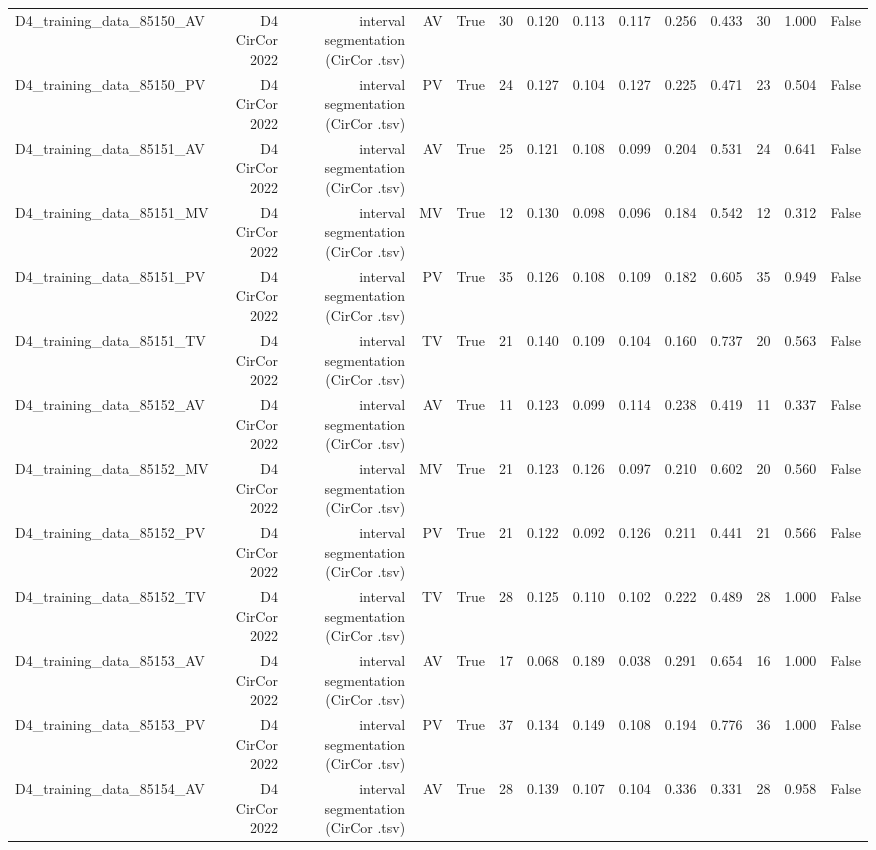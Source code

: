 \begin{table}[htbp]
\begin{tabular}{lrrrrrrrrrrrrr}
    D4\_training\_data\_85150\_AV & D4 CirCor 2022 & interval segmentation (CirCor .tsv) & AV & True & 30 & 0.120 & 0.113 & 0.117 & 0.256 & 0.433 & 30 & 1.000 & False \\
    D4\_training\_data\_85150\_PV & D4 CirCor 2022 & interval segmentation (CirCor .tsv) & PV & True & 24 & 0.127 & 0.104 & 0.127 & 0.225 & 0.471 & 23 & 0.504 & False \\
    D4\_training\_data\_85151\_AV & D4 CirCor 2022 & interval segmentation (CirCor .tsv) & AV & True & 25 & 0.121 & 0.108 & 0.099 & 0.204 & 0.531 & 24 & 0.641 & False \\
    D4\_training\_data\_85151\_MV & D4 CirCor 2022 & interval segmentation (CirCor .tsv) & MV & True & 12 & 0.130 & 0.098 & 0.096 & 0.184 & 0.542 & 12 & 0.312 & False \\
    D4\_training\_data\_85151\_PV & D4 CirCor 2022 & interval segmentation (CirCor .tsv) & PV & True & 35 & 0.126 & 0.108 & 0.109 & 0.182 & 0.605 & 35 & 0.949 & False \\
    D4\_training\_data\_85151\_TV & D4 CirCor 2022 & interval segmentation (CirCor .tsv) & TV & True & 21 & 0.140 & 0.109 & 0.104 & 0.160 & 0.737 & 20 & 0.563 & False \\
    D4\_training\_data\_85152\_AV & D4 CirCor 2022 & interval segmentation (CirCor .tsv) & AV & True & 11 & 0.123 & 0.099 & 0.114 & 0.238 & 0.419 & 11 & 0.337 & False \\
    D4\_training\_data\_85152\_MV & D4 CirCor 2022 & interval segmentation (CirCor .tsv) & MV & True & 21 & 0.123 & 0.126 & 0.097 & 0.210 & 0.602 & 20 & 0.560 & False \\
    D4\_training\_data\_85152\_PV & D4 CirCor 2022 & interval segmentation (CirCor .tsv) & PV & True & 21 & 0.122 & 0.092 & 0.126 & 0.211 & 0.441 & 21 & 0.566 & False \\
    D4\_training\_data\_85152\_TV & D4 CirCor 2022 & interval segmentation (CirCor .tsv) & TV & True & 28 & 0.125 & 0.110 & 0.102 & 0.222 & 0.489 & 28 & 1.000 & False \\
    D4\_training\_data\_85153\_AV & D4 CirCor 2022 & interval segmentation (CirCor .tsv) & AV & True & 17 & 0.068 & 0.189 & 0.038 & 0.291 & 0.654 & 16 & 1.000 & False \\
    D4\_training\_data\_85153\_PV & D4 CirCor 2022 & interval segmentation (CirCor .tsv) & PV & True & 37 & 0.134 & 0.149 & 0.108 & 0.194 & 0.776 & 36 & 1.000 & False \\
    D4\_training\_data\_85154\_AV & D4 CirCor 2022 & interval segmentation (CirCor .tsv) & AV & True & 28 & 0.139 & 0.107 & 0.104 & 0.336 & 0.331 & 28 & 0.958 & False \\

\end{tabular}
\end{table}
